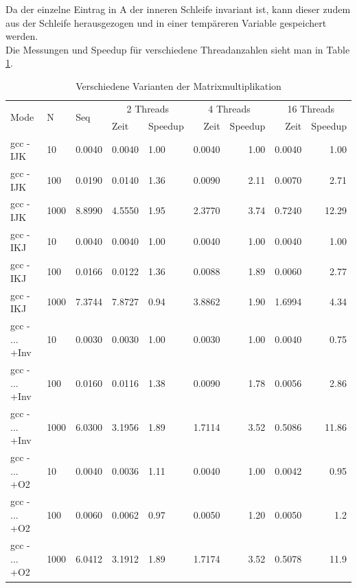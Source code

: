\documentclass{report}
\begin{document}
			Da der einzelne Eintrag in A der inneren Schleife invariant ist, kann dieser zudem aus der Schleife herausgezogen und in einer tempäreren Variable gespeichert werden. \\
			Die Messungen und Speedup für verschiedene Threadanzahlen sieht man in Table \ref{Table:2b}.

			\begin{table}
			\begin{tabular}{|l|p{1cm}|p{1cm}|p{1cm}|p{1.5cm}|r|r|r|r|}
				\hline
			\multirow{2}{*}{Mode} & \multirow{2}{*}{N} & \multirow{2}{*}{Seq} & \multicolumn{2}{|c|}{2 Threads} & \multicolumn{2}{|c|}{4 Threads} & \multicolumn{2}{|c|}{16 Threads} \\
				& & & Zeit & Speedup & Zeit & Speedup & Zeit & Speedup \\
				\hline
				gcc - IJK & 10 & 		   0.0040  &     0.0040  &  1.00&      0.0040   & 1.00 &      0.0040  &  1.00\\
				
				gcc - IJK & 100 &           0.0190  &     0.0140  &  1.36&      0.0090   & 2.11&      0.0070  & 2.71\\
				
				gcc - IJK & 1000 &          8.8990  &     4.5550  &  1.95&        2.3770   & 3.74&       0.7240  & 12.29\\
				\hline
				gcc - IKJ  & 10 & 			0.0040  & 	 0.0040  & 1.00 & 	  0.0040  &  1.00&			0.0040 & 1.00\\
				
				gcc - IKJ & 100 &			0.0166  &     0.0122  &  1.36&		 0.0088  & 1.89&         0.0060  & 2.77\\
				
				gcc - IKJ & 1000 & 			7.3744  & 	 7.8727  & 0.94& 	  3.8862 & 1.90&         1.6994  & 4.34\\
				\hline
				gcc - ... +Inv & 10 &      0.0030  &     0.0030  & 1.00&       0.0030  & 1.00&        0.0040  & 0.75\\
				gcc - ... +Inv & 100 &	    0.0160  &     0.0116  & 1.38&       0.0090  & 1.78&			0.0056 & 2.86\\
				gcc - ... +Inv & 1000 & 	6.0300  &	3.1956  & 1.89&			1.7114 & 3.52&		0.5086 & 11.86\\
				\hline
				gcc - ... +O2 & 10 &  0.0040  &     0.0036  &  1.11&      0.0040   & 1.00&      0.0042  &  0.95\\
				 
				gcc - ... +O2 & 100 & 0.0060  &	  0.0062  &  0.97 &		0.0050  & 1.20 &        0.0050  &  1.2\\
				
				gcc - ... +O2 & 1000 & 6.0412  & 	3.1912 & 1.89 &       1.7174  & 3.52 &		  0.5078 & 11.9\\
				\hline
			\end{tabular}
			\caption{Verschiedene Varianten der Matrixmultiplikation}
			\label{Table:2b}
		\end{table}
\end{document}
